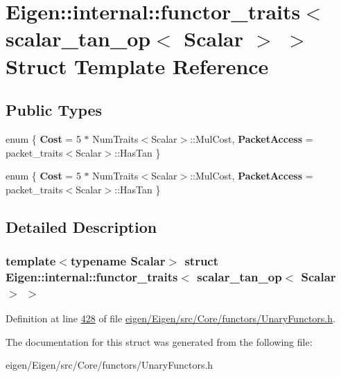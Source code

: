 \hypertarget{struct_eigen_1_1internal_1_1functor__traits_3_01scalar__tan__op_3_01_scalar_01_4_01_4}{}\section{Eigen\+:\+:internal\+:\+:functor\+\_\+traits$<$ scalar\+\_\+tan\+\_\+op$<$ Scalar $>$ $>$ Struct Template Reference}
\label{struct_eigen_1_1internal_1_1functor__traits_3_01scalar__tan__op_3_01_scalar_01_4_01_4}
\subsection*{Public Types}
\begin{DoxyCompactItemize}
\item 
\mbox{\label{struct_eigen_1_1internal_1_1functor__traits_3_01scalar__tan__op_3_01_scalar_01_4_01_4_adb14f56a99be7e51fd23532a02e6f160}} 
enum \{ {\bfseries Cost} = 5 $\ast$ Num\+Traits$<$Scalar$>$\+:\+:Mul\+Cost, 
{\bfseries Packet\+Access} = packet\+\_\+traits$<$Scalar$>$\+:\+:Has\+Tan
 \}
\item 
\mbox{\label{struct_eigen_1_1internal_1_1functor__traits_3_01scalar__tan__op_3_01_scalar_01_4_01_4_a4c6cda856d3e8050a0325dd2f29cec7f}} 
enum \{ {\bfseries Cost} = 5 $\ast$ Num\+Traits$<$Scalar$>$\+:\+:Mul\+Cost, 
{\bfseries Packet\+Access} = packet\+\_\+traits$<$Scalar$>$\+:\+:Has\+Tan
 \}
\end{DoxyCompactItemize}


\subsection{Detailed Description}
\subsubsection*{template$<$typename Scalar$>$\newline
struct Eigen\+::internal\+::functor\+\_\+traits$<$ scalar\+\_\+tan\+\_\+op$<$ Scalar $>$ $>$}



Definition at line \hyperlink{eigen_2_eigen_2src_2_core_2functors_2_unary_functors_8h_source_l00428}{428} of file \hyperlink{eigen_2_eigen_2src_2_core_2functors_2_unary_functors_8h_source}{eigen/\+Eigen/src/\+Core/functors/\+Unary\+Functors.\+h}.



The documentation for this struct was generated from the following file\+:\begin{DoxyCompactItemize}
\item 
eigen/\+Eigen/src/\+Core/functors/\+Unary\+Functors.\+h\end{DoxyCompactItemize}
